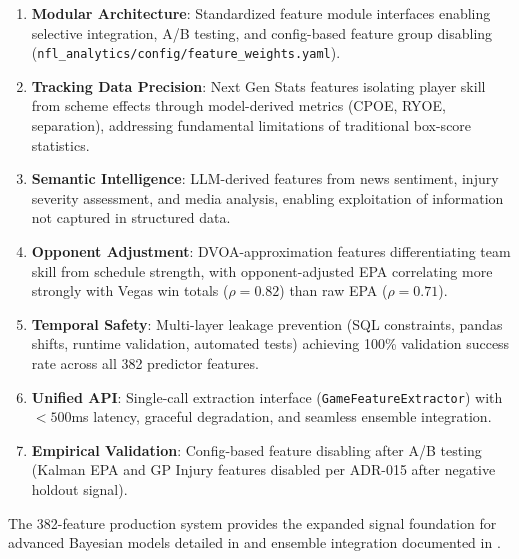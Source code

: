 \begin{enumerate}
  \item \textbf{Modular Architecture}: Standardized feature module interfaces enabling selective integration, A/B testing, and config-based feature group disabling (\texttt{nfl\_analytics/config/\allowbreak feature\_weights.yaml}).

  \item \textbf{Tracking Data Precision}: Next Gen Stats features isolating player skill from scheme effects through model-derived metrics (CPOE, RYOE, separation), addressing fundamental limitations of traditional box-score statistics.

  \item \textbf{Semantic Intelligence}: LLM-derived features from news sentiment, injury severity assessment, and media analysis, enabling exploitation of information not captured in structured data.

  \item \textbf{Opponent Adjustment}: DVOA-approximation features differentiating team skill from schedule strength, with opponent-adjusted EPA correlating more strongly with Vegas win totals ($\rho = 0.82$) than raw EPA ($\rho = 0.71$).

  \item \textbf{Temporal Safety}: Multi-layer leakage prevention (SQL constraints, pandas shifts, runtime validation, automated tests) achieving 100\% validation success rate across all 382 predictor features.

  \item \textbf{Unified API}: Single-call extraction interface (\texttt{GameFeatureExtractor}) with $<500$ms latency, graceful degradation, and seamless ensemble integration.

  \item \textbf{Empirical Validation}: Config-based feature disabling after A/B testing (Kalman EPA and GP Injury features disabled per ADR-015 after negative holdout signal).
\end{enumerate}

The 382-feature production system provides the expanded signal foundation for advanced Bayesian models detailed in  and ensemble integration documented in .
